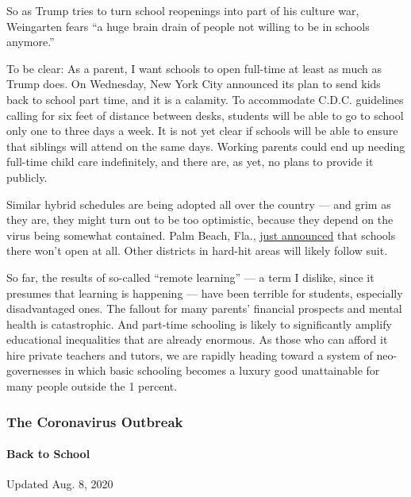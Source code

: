 So as Trump tries to turn school reopenings into part of his culture
war, Weingarten fears ``a huge brain drain of people not willing to be
in schools anymore.''

To be clear: As a parent, I want schools to open full-time at least as
much as Trump does. On Wednesday, New York City announced its plan to
send kids back to school part time, and it is a calamity. To accommodate
C.D.C. guidelines calling for six feet of distance between desks,
students will be able to go to school only one to three days a week. It
is not yet clear if schools will be able to ensure that siblings will
attend on the same days. Working parents could end up needing full-time
child care indefinitely, and there are, as yet, no plans to provide it
publicly.

Similar hybrid schedules are being adopted all over the country --- and
grim as they are, they might turn out to be too optimistic, because they
depend on the virus being somewhat contained. Palm Beach, Fla.,
\href{https://www.palmbeachpost.com/news/20200708/pbc-school-campuses-will-remain-closed-to-students-board-members-decide}{just
announced} that schools there won't open at all. Other districts in
hard-hit areas will likely follow suit.

So far, the results of so-called ``remote learning'' --- a term I
dislike, since it presumes that learning is happening --- have been
terrible for students, especially disadvantaged ones. The fallout for
many parents' financial prospects and mental health is catastrophic. And
part-time schooling is likely to significantly amplify educational
inequalities that are already enormous. As those who can afford it hire
private teachers and tutors, we are rapidly heading toward a system of
neo-governesses in which basic schooling becomes a luxury good
unattainable for many people outside the 1 percent.

\hypertarget{the-coronavirus-outbreak}{%
\subsubsection{The Coronavirus
Outbreak}\label{the-coronavirus-outbreak}}

\hypertarget{back-to-school}{%
\paragraph{Back to School}\label{back-to-school}}

Updated Aug. 8, 2020

